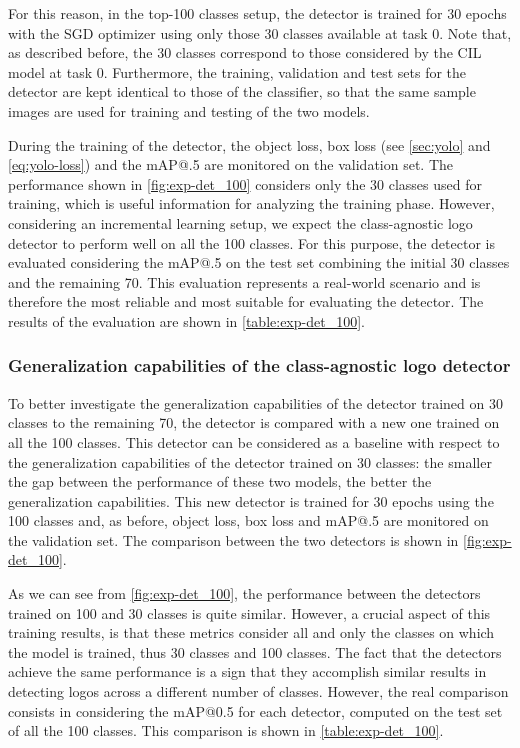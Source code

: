 For this reason, in the top-100 classes setup, the detector is trained for 30 epochs with the SGD optimizer using only those 30 classes available at task 0.
Note that, as described before, the 30 classes correspond to those considered by the CIL model at task 0. Furthermore, the training, validation and test sets for the detector are kept identical to those of the classifier, so that the same sample images are used for training and testing of the two models.

During the training of the detector, the object loss, box loss (see \autoref{sec:yolo} and \autoref{eq:yolo-loss}) and the mAP@.5 are monitored on the validation set. The performance shown in \autoref{fig:exp-det_100} considers only the 30 classes used for training, which is useful information for analyzing the training phase. However, considering an incremental learning setup, we expect the class-agnostic logo detector to perform well on all the 100 classes.
For this purpose, the detector is evaluated considering the mAP@.5 on the test set
combining the initial 30 classes and the remaining 70.
This evaluation represents a real-world scenario and is therefore the most reliable and most suitable for evaluating the detector.
The results of the evaluation are shown in \autoref{table:exp-det_100}.


\subsubsection{Generalization capabilities of the class-agnostic logo detector}
To better investigate the generalization capabilities of the detector trained on 30 classes to the remaining 70, the detector is compared with a new one trained on all the 100 classes.
This detector can be considered as a baseline with respect to the generalization capabilities of the detector trained on 30 classes: the smaller the gap between the performance of these two models, the better the generalization capabilities.
This new detector is trained for 30 epochs using the 100 classes and, as before, object loss, box loss and mAP@.5 are monitored on the validation set. The comparison between the two detectors is shown in \autoref{fig:exp-det_100}.

As we can see from \autoref{fig:exp-det_100}, the performance between the detectors trained on 100 and 30 classes is quite similar.
However, a crucial aspect of this training results, is that these metrics consider all and only the classes on which the model is trained, thus 30 classes and 100 classes.
The fact that the detectors achieve the same performance is a sign that they accomplish similar results in detecting logos across a different number of classes.
However, the real comparison consists in considering the mAP@0.5 for each detector, computed on the test set of all the 100 classes. This comparison is shown in \autoref{table:exp-det_100}.

